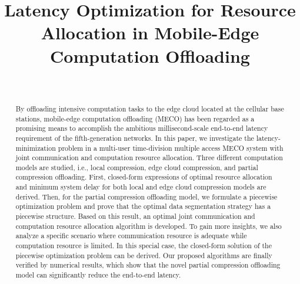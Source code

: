 \documentclass[journal,draftcls,onecolumn,12pt,twoside]{IEEEtran}
\begin{document}
\title{Latency Optimization for Resource Allocation in Mobile-Edge Computation Offloading}
\author{\\
\vspace*{0.3cm}
\small{}}
\maketitle

\begin{abstract}
By offloading intensive computation tasks to the edge cloud located at the cellular base stations, mobile-edge computation offloading (MECO) has been regarded as a promising means to accomplish the ambitious millisecond-scale end-to-end latency requirement of the fifth-generation networks. In this paper, we investigate the latency-minimization problem in a multi-user time-division multiple access MECO system with joint communication and computation resource allocation. Three different computation models are studied, i.e.,  local compression, edge cloud compression, and partial compression offloading. First, closed-form expressions of optimal resource allocation and minimum system delay for both local and edge cloud compression models are derived. Then, for the partial compression offloading model, we formulate a piecewise optimization problem and prove that the optimal data segmentation strategy has a piecewise structure. Based on this result, an optimal joint communication and computation resource allocation algorithm is developed. To gain more insights, we also analyze a specific scenario where communication resource is adequate while computation resource is limited. In this special case, the closed-form solution of the piecewise optimization problem can be derived. Our proposed algorithms are finally verified by numerical results, which show that the novel partial compression offloading model can significantly reduce the end-to-end latency.
\end{abstract}
\end{document}
